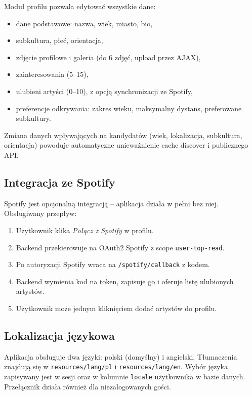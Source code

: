 \documentclass[12pt,a4paper]{article}
\begin{document}
Moduł profilu pozwala edytować wszystkie dane:
\begin{itemize}
    \item dane podstawowe: nazwa, wiek, miasto, bio,
    \item subkultura, płeć, orientacja,
    \item zdjęcie profilowe i galeria (do 6 zdjęć, upload przez AJAX),
    \item zainteresowania (5--15),
    \item ulubieni artyści (0--10), z opcją synchronizacji ze Spotify,
    \item preferencje odkrywania: zakres wieku, maksymalny dystans, preferowane subkultury.
\end{itemize}

Zmiana danych wpływających na kandydatów (wiek, lokalizacja, subkultura, orientacja) powoduje automatyczne unieważnienie cache discover i publicznego API.

\subsection{Integracja ze Spotify}

Spotify jest opcjonalną integracją -- aplikacja działa w pełni bez niej. Obsługiwany przepływ:
\begin{enumerate}
    \item Użytkownik klika \textit{Połącz z Spotify} w profilu.
    \item Backend przekierowuje na OAuth2 Spotify z scope \texttt{user-top-read}.
    \item Po autoryzacji Spotify wraca na \texttt{/spotify/callback} z kodem.
    \item Backend wymienia kod na token, zapisuje go i oferuje listę ulubionych artystów.
    \item Użytkownik może jednym kliknięciem dodać artystów do profilu.
\end{enumerate}

\subsection{Lokalizacja językowa}

Aplikacja obsługuje dwa języki: polski (domyślny) i angielski. Tłumaczenia znajdują się w \texttt{resources/lang/pl} i \texttt{resources/lang/en}. Wybór języka zapisywany jest w sesji oraz w kolumnie \texttt{locale} użytkownika w bazie danych. Przełącznik działa również dla niezalogowanych gości.
\end{document}
